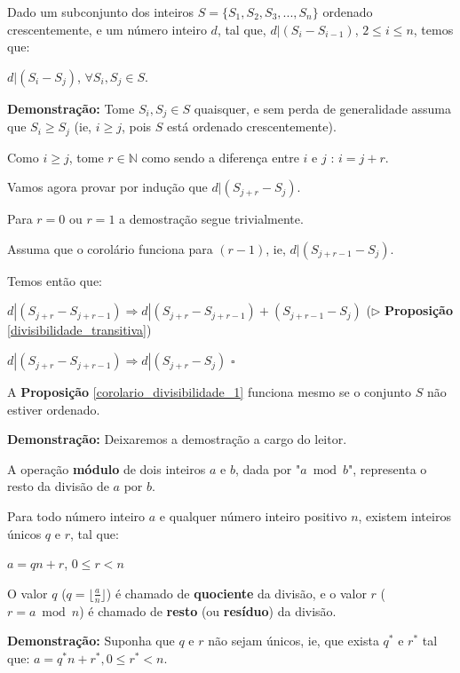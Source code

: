 \begin{proposition}\label{corolario_divisibilidade_1}
Dado um subconjunto dos inteiros $S = \{S_1, S_2, S_3, ..., S_n\}$ ordenado crescentemente, e um número inteiro $d$, tal que, $d|(S_i-S_{i-1})$, $2 \leq i \leq n$, 
temos que: 

$d|(S_i-S_j)$, $\forall S_i, S_j \in S$.

\end{proposition}
\textbf{Demonstração:}
Tome $S_i,S_j \in S$ quaisquer, e sem perda de generalidade assuma que $S_i \geq S_j$ (ie, $i \geq j$, pois $S$ está ordenado crescentemente).

Como $i \geq j$, tome $r \in \mathbb{N}$ como sendo a diferença entre $i$ e $j$ : $i = j + r$.

Vamos agora provar por indução que $d|(S_{j+r}-S_j)$.

Para $r=0$ ou $r=1$ a demostração segue trivialmente.

Assuma que o corolário funciona para $(r-1)$, ie, $d|(S_{j+r-1}-S_j)$. 

Temos então que: 

$d|(S_{j+r}-S_{j+r-1}) \Rightarrow d|(S_{j+r}-S_{j+r-1})+(S_{j+r-1}-S_j)$ ($\triangleright$ \textbf{Proposição} \autoref{divisibilidade_transitiva})

$d|(S_{j+r}-S_{j+r-1}) \Rightarrow d|(S_{j+r}-S_j)$ $\square$ 


\begin{proposition}\label{corolario_divisibilidade_1.1}
A \textbf{Proposição} \autoref{corolario_divisibilidade_1} funciona mesmo se o conjunto $S$ não estiver ordenado.
\end{proposition}
\textbf{Demonstração:}
Deixaremos a demostração a cargo do leitor.
\newline

\begin{definition}
A operação \textbf{módulo} de dois inteiros $a$ e $b$, dada por "$a \bmod b$", representa o resto da divisão de $a$ por $b$.
\end{definition}

\begin{theorem}\label{algoritmo_divisao}
Para todo número inteiro $a$ e qualquer número inteiro positivo $n$, existem inteiros únicos $q$ e $r$, tal que:

$a = qn + r$, $0 \leq r < n$

O valor $q$ ($q = \lfloor  \frac{a}{n} \rfloor$) é chamado de \textbf{quociente} da divisão, e o valor $r$ ($r = a \bmod n$) é chamado de \textbf{resto}
(ou \textbf{resíduo}) da divisão.
\end{theorem}
\textbf{Demonstração:}
Suponha que $q$ e $r$ não sejam únicos, ie, que exista $q^*$ e $r^*$ tal que: $a = q^*n + r^*, 0 \leq r^* < n$.

